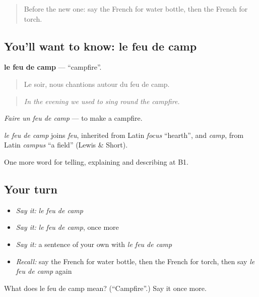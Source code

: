 \begin{quote}
Before the new one: say the French for water bottle, then the French for torch.
\end{quote}

\subsection*{You'll want to know: le feu de camp}
\textbf{le feu de camp} — \textquotedblleft{}campfire\textquotedblright{}.

\begin{quote}
Le soir, nous chantions autour du feu de camp.
\end{quote}

\begin{quote}
\emph{In the evening we used to sing round the campfire.}
\end{quote}

\emph{Faire un feu de camp} — to make a campfire.

\begin{cousinweb}
\emph{le feu de camp} joins \emph{feu}, inherited from Latin \emph{focus} \textquotedblleft{}hearth\textquotedblright{}, and \emph{camp}, from Latin \emph{campus} \textquotedblleft{}a field\textquotedblright{} (Lewis \& Short).
\end{cousinweb}

\begin{grammarlens}[title={What you've built}]
One more word for telling, explaining and describing at B1.
\end{grammarlens}

\subsection*{Your turn}
\begin{itemize}
\raggedright
  \item \emph{Say it:} \emph{le feu de camp}
  \item \emph{Say it:} \emph{le feu de camp}, once more
  \item \emph{Say it:} a sentence of your own with \emph{le feu de camp}
  \item \emph{Recall:} say the French for water bottle, then the French for torch, then say \emph{le feu de camp} again
\end{itemize}

\begin{tcolorbox}[breakable,colback=teal!4,colframe=teal!35!black,title={Before you move on}]
What does le feu de camp mean? (\textquotedblleft{}Campfire\textquotedblright{}.) Say it once more.
\end{tcolorbox}
